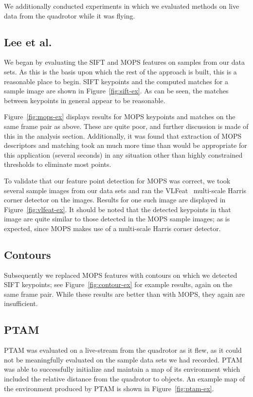 \documentclass{acmsiggraph}
\begin{document}
We additionally conducted experiments in which we evaluated methods on live data from the quadrotor while it was flying.

\subsection{Lee et al.}
We began by evaluating the SIFT and MOPS features on samples from our data sets. As this is the basis upon which the rest of the approach is built, this is a reasonable place to begin. SIFT keypoints and the computed matches for a sample image are shown in Figure~\ref{fig:sift-ex}. As can be seen, the matches between keypoints in general appear to be reasonable.

Figure~\ref{fig:mops-ex} displays results for MOPS keypoints and matches on the same frame pair as above. These are quite poor, and further discussion is made of this in the analysis section. Additionally, it was found that extraction of MOPS descriptors and matching took an much more time than would be appropriate for this application (several seconds) in any situation other than highly constrained thresholds to eliminate most points.

To validate that our feature point detection for MOPS was correct, we took several sample images from our data sets and ran the VLFeat~\cite{vlfeat} multi-scale Harris corner detector on the images. Results for one such image are displayed in Figure~\ref{fig:vlfeat-ex}. It should be noted that the detected keypoints in that image are quite similar to those detected in the MOPS sample images; as is expected, since MOPS makes use of a multi-scale Harris corner detector.

\subsection{Contours}
Subsequently we replaced MOPS features with contours on which we detected SIFT keypoints; see Figure~\ref{fig:contour-ex} for example results, again on the same frame pair. While these results are better than with MOPS, they again are insufficient.

\subsection{PTAM}
PTAM was evaluated on a live-stream from the quadrotor as it flew, as it could not be meaningfully evaluated on the sample data sets we had recorded. PTAM was able to successfully initialize and maintain a map of its environment which included the relative distance from the quadrotor to objects. An example map of the environment produced by PTAM is shown in Figure~\ref{fig:ptam-ex}.
\end{document}
